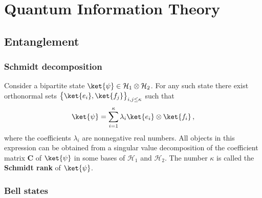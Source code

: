 \chapter{Quantum Information Theory}\label{chapter:quantum_computing}

    \minitoc

\section{Entanglement}
\subsection{Schmidt decomposition}

    \begin{construct}
        Consider a bipartite state $\ket{\psi}\in\mathcal{H}_1\otimes\mathcal{H}_2$. For any such state there exist orthonormal sets $\bigl\{\ket{e_i},\ket{f_j}\bigr\}_{i,j\leq\kappa}$ such that
        \begin{gather}
            \ket{\psi} = \sum_{i=1}^\kappa\lambda_i\ket{e_i}\otimes\ket{f_i}\,,
        \end{gather}
        where the coefficients $\lambda_i$ are nonnegative real numbers. All objects in this expression can be obtained from a singular value decomposition of the coefficient matrix $\mathbf{C}$ of $\ket{\psi}$ in some bases of $\mathcal{H}_1$ and $\mathcal{H}_2$. The number $\kappa$ is called the \textbf{Schmidt rank} of $\ket{\psi}$.
    \end{construct}


\subsection{Bell states}

